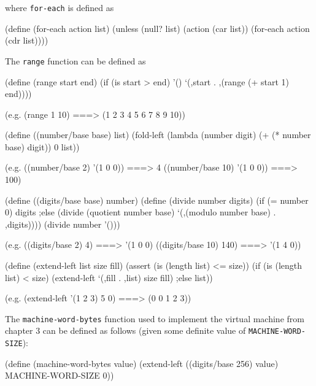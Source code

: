 where \texttt{for-each} is defined as

\begin{Snippet}
  (define (for-each action list)
    (unless (null? list)
      (action (car list))
      (for-each action (cdr list))))
\end{Snippet}

The \texttt{range} function can be defined as

\begin{Snippet}
  (define (range start end)
    (if (is start > end)
        '()
        `(,start . ,(range (+ start 1) end))))
\end{Snippet}

\begin{Snippet}
  (e.g.
   (range 1 10)
    ===> (1 2 3 4 5 6 7 8 9 10))
\end{Snippet}

\begin{Snippet}
  (define ((number/base base) list)
    (fold-left (lambda (number digit)
                 (+ (* number base) digit))
               0
               list))
\end{Snippet}

\begin{Snippet}
  (e.g.
    ((number/base 2) '(1 0 0)) ===> 4
    ((number/base 10) '(1 0 0)) ===> 100)
\end{Snippet}

\begin{Snippet}
  (define ((digits/base base) number)
    (define (divide number digits)
      (if (= number 0)
          digits
      ;else
          (divide (quotient number base)
                  `(,(modulo number base) . ,digits))))
    (divide number '()))
\end{Snippet}

\begin{Snippet}
  (e.g.
   ((digits/base 2) 4) ===> '(1 0 0)
   ((digits/base 10) 140) ===> '(1 4 0))
\end{Snippet}

\begin{Snippet}
  (define (extend-left list size fill)
    (assert (is (length list) <= size))
    (if (is (length list) < size)
        (extend-left `(,fill . ,list) size fill)
    ;else
        list))
\end{Snippet}

\begin{Snippet}
  (e.g. (extend-left '(1 2 3) 5 0) ===> (0 0 1 2 3))
\end{Snippet}

  
The \texttt{machine-word-bytes} function used to implement the virtual
machine from chapter 3 can be defined as follows (given some definite
value of \texttt{MACHINE-WORD-SIZE}):

\begin{Snippet}
  (define (machine-word-bytes value)
    (extend-left ((digits/base 256) value) MACHINE-WORD-SIZE 0))
\end{Snippet}

